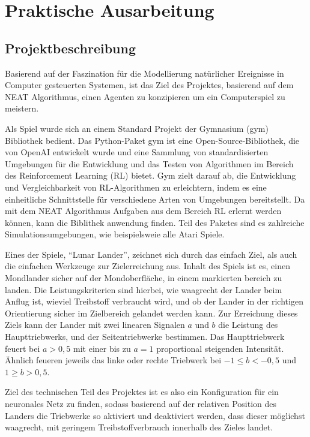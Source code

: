 \chapter{Praktische Ausarbeitung}
\label{chapter:3}
\section{Projektbeschreibung}
Basierend auf der Faszination für die Modellierung natürlicher Ereignisse in Computer gesteuerten Systemen, ist das Ziel des Projektes, basierend auf dem NEAT Algorithmus, einen Agenten zu konzipieren um ein Computerspiel zu meistern.

Als Spiel wurde sich an einem Standard Projekt der Gymnasium (gym) Bibliothek \cite{gymnasiumbib} bedient. Das Python-Paket gym ist eine Open-Source-Bibliothek, die von OpenAI entwickelt wurde und eine Sammlung von standardisierten Umgebungen für die Entwicklung und das Testen von Algorithmen im Bereich des Reinforcement Learning (RL) bietet. Gym zielt darauf ab, die Entwicklung und Vergleichbarkeit von RL-Algorithmen zu erleichtern, indem es eine einheitliche Schnittstelle für verschiedene Arten von Umgebungen bereitstellt. Da mit dem NEAT Algorithmus Aufgaben aus dem Bereich RL erlernt werden können, kann die Biblithek anwendung finden. Teil des Paketes sind es zahlreiche Simulationsumgebungen, wie beispielsweie alle Atari Spiele. 

Eines der Spiele, \enquote{Lunar Lander}, zeichnet sich durch das einfach Ziel, als auch die einfachen Werkzeuge zur Zielerreichung aus. Inhalt des Spiels ist es, einen Mondlander sicher auf der Mondoberfläche, in einem markierten bereich zu landen. Die Leistungskriterien sind hierbei, wie waagrecht der Lander beim Anflug ist, wieviel Treibstoff verbraucht wird, und ob der Lander in der richtigen Orientierung sicher im Zielbereich gelandet werden kann. Zur Erreichung dieses Ziels kann der Lander mit zwei linearen Signalen $a$ und $b$ die Leistung des Haupttriebwerks, und der Seitentriebwerke bestimmen. Das Haupttriebwerk feuert bei $a>0,5$ mit einer bis zu $a=1$ proportional steigenden Intensität. Ähnlich feueren jeweils das linke oder rechte Triebwerk bei $-1\leq b<-0,5$ und $1 \geq b>0,5$.

Ziel des technischen Teil des Projektes ist es also ein Konfiguration für ein neuronales Netz zu finden, sodass basierend auf der relativen Position des Landers die Triebwerke so aktiviert und deaktiviert werden, dass dieser möglichst waagrecht, mit geringem Treibstoffverbrauch innerhalb des Zieles landet. 


